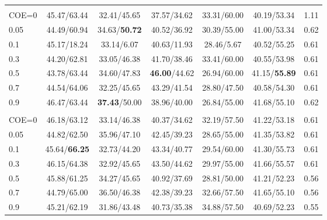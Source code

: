 \begin{table}[t]
\begin{tabular}{@{}lcccccc@{}}
\rowcolor{gray!15}
\multicolumn{7}{@{}l@{}}{\textbf{BudgetMem-\textsc{Rea}} (COE)} \\
COE=0   & 45.47/63.44 & 32.41/45.65 & 37.57/34.62 & 33.31/60.00 & 40.19/53.34 & 1.11 \\
0.05    & 44.49/60.94 & 34.63/\textbf{50.72} & 40.52/36.92 & 30.39/55.00 & 41.00/53.34 & 0.62 \\
0.1     & 45.17/18.24 & 33.14/6.07  & 40.63/11.93 & 28.46/5.67  & 40.52/55.25 & 0.61 \\
0.3     & 44.20/62.81 & 33.05/46.38 & 41.70/38.46 & 33.41/60.00 & 40.55/53.98 & 0.61 \\
0.5     & 43.78/63.44 & 34.60/47.83 & \textbf{46.00}/44.62 & 26.94/60.00 & 41.15/\textbf{55.89} & 0.61 \\
0.7     & 44.54/64.06 & 32.25/45.65 & 43.29/41.54 & 28.80/47.50 & 40.58/54.30 & 0.61 \\
0.9     & 46.47/63.44 & \textbf{37.43}/50.00 & 38.96/40.00 & 26.84/55.00 & 41.68/55.10 & 0.62 \\
\midrule

\rowcolor{gray!15}
\multicolumn{7}{@{}l@{}}{\textbf{\textbf{BudgetMem-\textsc{Cap}} (COE)}} \\
COE=0   & 46.18/63.12 & 33.14/46.38 & 40.37/34.62 & 32.19/57.50 & 41.22/53.18 & 0.61 \\
0.05    & 44.82/62.50 & 35.96/47.10 & 42.45/39.23 & 28.65/55.00 & 41.35/53.82 & 0.61 \\
0.1     & 45.64/\textbf{66.25} & 32.73/44.20 & 43.34/40.77 & 29.54/60.00 & 41.30/55.73 & 0.61 \\
0.3     & 46.15/64.38 & 32.92/45.65 & 43.50/44.62 & 29.97/55.00 & 41.66/55.57 & 0.61 \\
0.5     & 45.88/61.25 & 34.27/45.65 & 40.92/37.69 & 28.81/50.00 & 41.21/52.23 & 0.56 \\
0.7     & 44.79/65.00 & 36.50/46.38 & 42.38/39.23 & 32.66/57.50 & 41.65/55.10 & 0.56 \\
0.9     & 45.21/62.19 & 31.86/43.48 & 40.73/35.38 & 34.88/57.50 & 40.69/52.23 & 0.55 \\
\bottomrule
\end{tabular}
\end{table}